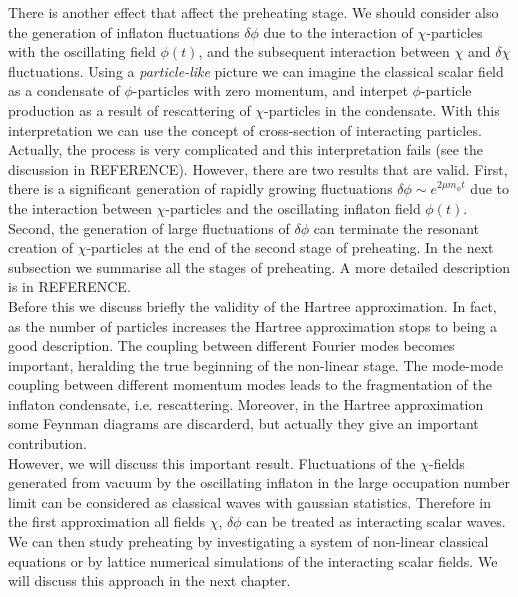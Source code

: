 \documentclass[11pt,a4paper,twoside]{book}
\begin{document}
There is another effect that affect the preheating stage. We should consider also the generation of inflaton fluctuations $\delta \phi$ due to the interaction of $\chi$-particles with the oscillating field $\phi(t)$, and the subsequent interaction between $\chi$ and $\delta \chi$ fluctuations. Using a \textit{particle-like} picture we can imagine the classical scalar field as a condensate of $\phi$-particles with zero momentum, and interpet $\phi$-particle production as a result of rescattering of $ \chi $-particles in the condensate. With this interpretation we can use the concept of cross-section of interacting particles. Actually, the process is very complicated and this interpretation fails (see the discussion in REFERENCE). However, there are two results that are valid. First, there is a significant generation of rapidly growing fluctuations $ \delta \phi \sim e^{2\mu m_{\phi}t} $ due to the interaction between $ \chi $-particles and the oscillating inflaton field $ \phi(t) $. Second, the generation of large fluctuations of $\delta \phi$ can terminate the resonant creation of $\chi$-particles at the end of the second stage of preheating. In the next subsection we summarise all the stages of preheating. A more detailed description is in REFERENCE. \\
Before this we discuss briefly the validity of the Hartree approximation. In fact, as the number of particles increases the Hartree approximation stops to  being a good description. The coupling between different Fourier modes becomes important, heralding the true beginning of the non-linear stage. The mode-mode coupling between different momentum modes leads to the fragmentation of the inflaton condensate, i.e. rescattering.  Moreover, in the Hartree approximation some Feynman diagrams are discarderd, but actually they give an important contribution.\\
However, we will discuss this important result. Fluctuations of the $\chi$-fields generated from vacuum by the oscillating inflaton in the large occupation number limit can be considered as classical waves with gaussian statistics. Therefore in the first approximation all fields $\chi$, $\delta \phi$ can be treated as interacting scalar waves. We can then study preheating by investigating  a system of non-linear classical equations or by lattice numerical simulations of the interacting scalar fields. We will discuss this approach in the next chapter.
\end{document}
